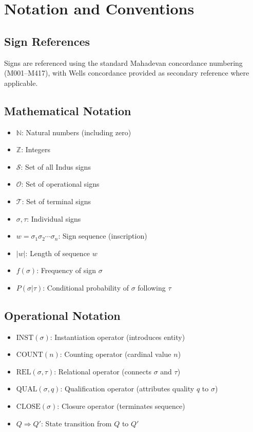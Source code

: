 \chapter*{Notation and Conventions}

\section*{Sign References}

Signs are referenced using the standard Mahadevan concordance numbering (M001--M417), with Wells concordance provided as secondary reference where applicable.

\section*{Mathematical Notation}

\begin{itemize}
    \item $\mathbb{N}$: Natural numbers (including zero)
    \item $\mathbb{Z}$: Integers
    \item $\mathcal{S}$: Set of all Indus signs
    \item $\mathcal{O}$: Set of operational signs
    \item $\mathcal{T}$: Set of terminal signs
    \item $\sigma, \tau$: Individual signs
    \item $w = \sigma_1\sigma_2\cdots\sigma_n$: Sign sequence (inscription)
    \item $|w|$: Length of sequence $w$
    \item $f(\sigma)$: Frequency of sign $\sigma$
    \item $P(\sigma|\tau)$: Conditional probability of $\sigma$ following $\tau$
\end{itemize}

\section*{Operational Notation}

\begin{itemize}
    \item $\text{INST}(\sigma)$: Instantiation operator (introduces entity)
    \item $\text{COUNT}(n)$: Counting operator (cardinal value $n$)
    \item $\text{REL}(\sigma, \tau)$: Relational operator (connects $\sigma$ and $\tau$)
    \item $\text{QUAL}(\sigma, q)$: Qualification operator (attributes quality $q$ to $\sigma$)
    \item $\text{CLOSE}(\sigma)$: Closure operator (terminates sequence)
    \item $Q \Rightarrow Q'$: State transition from $Q$ to $Q'$
\end{itemize}

